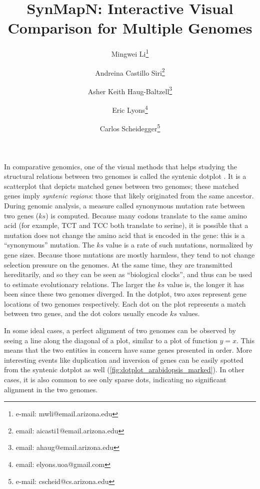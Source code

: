 \documentclass{vgtc}                      %
\title{SynMapN: Interactive Visual Comparison for Multiple Genomes}
\author{
Mingwei Li\thanks{e-mail: mwli@email.arizona.edu}
\and Andreina Castillo Siri\thanks{email: aicasti1@email.arizona.edu}
\and Asher Keith Haug-Baltzell\thanks{email: ahaug@email.arizona.edu}
\and Eric Lyons\thanks{email: elyons.uoa@gmail.com}
\and Carlos Scheidegger\thanks{e-mail: cscheid@cs.arizona.edu}
}
\affiliation{\scriptsize University of Arizona}
\begin{document}
\maketitle
In comparative genomics, one of the visual methods that helps studying the structural relations between two genomes is called the syntenic dotplot \cite{syntenic_dotplot, synmap}.
It is a scatterplot that depicts matched genes between two genomes; these matched genes imply \emph{syntenic regions}: those that likely originated from the same ancestor.
During genomic analysis, a measure called synonymous mutation rate between two genes ($ks$) is computed.
Because many codons translate to the same amino acid (for example, TCT and TCC both translate to serine), it is possible that a mutation does not change the amino acid that is encoded in the gene: this is a ``synonymous'' mutation.
The $ks$ value is a rate of such mutations, normalized by gene sizes. Because those mutations are mostly harmless, they tend to not change selection pressure on the genomes. At the same time, they are transmitted hereditarily, and so they can be seen as ``biological clocks'', and thus can be used to estimate evolutionary relations.
The larger the $ks$ value is, the longer it has been since these two genomes diverged.
In the dotplot, two axes represent gene locations of two genomes respectively. Each dot on the plot represents a match between two genes, and the dot colors usually encode $ks$ values.

In some ideal cases, a perfect alignment of two genomes can be observed by seeing a line along the diagonal of a plot, similar to a plot of function $y=x$. This means that the two entities in concern have same genes presented in order. More interesting events like duplication and inversion of genes can be easily spotted from the syntenic dotplot as well (\autoref{fig:dotplot_arabidopsis_marked}). In other cases, it is also common to see only sparse dots, indicating no significant alignment in the two genomes.
\end{document}
